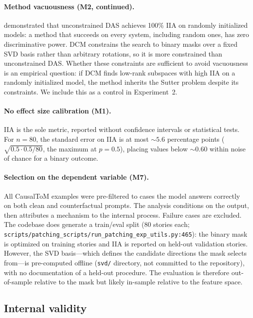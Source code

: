 \documentclass{article}
\begin{document}
\paragraph{Method vacuousness (M2, continued).}
\citet{sutter2025vacuous} demonstrated that unconstrained DAS achieves 100\% IIA on randomly initialized models: a method that succeeds on every system, including random ones, has zero discriminative power. DCM constrains the search to binary masks over a fixed SVD basis rather than arbitrary rotations, so it is more constrained than unconstrained DAS. Whether these constraints are sufficient to avoid vacuousness is an empirical question: if DCM finds low-rank subspaces with high IIA on a randomly initialized model, the method inherits the Sutter problem despite its constraints. We include this as a control in Experiment~2.

\paragraph{No effect size calibration (M1).}
IIA is the sole metric, reported without confidence intervals or statistical tests. For $n = 80$, the standard error on IIA is at most ${\sim}5.6$ percentage points ($\sqrt{0.5 \cdot 0.5 / 80}$, the maximum at $p = 0.5$), placing values below ${\sim}0.60$ within noise of chance for a binary outcome.

\paragraph{Selection on the dependent variable (M7).}
All CausalToM examples were pre-filtered to cases the model answers correctly on both clean and counterfactual prompts. The analysis conditions on the output, then attributes a mechanism to the internal process. Failure cases are excluded. The codebase does generate a train/eval split (80 stories each; \texttt{scripts/patching\_scripts/run\_patching\_exp\_utils.py:465}): the binary mask is optimized on training stories and IIA is reported on held-out validation stories. However, the SVD basis---which defines the candidate directions the mask selects from---is pre-computed offline (\texttt{svd/} directory, not committed to the repository), with no documentation of a held-out procedure. The evaluation is therefore out-of-sample relative to the mask but likely in-sample relative to the feature space.

\subsection{Internal validity}
\end{document}
